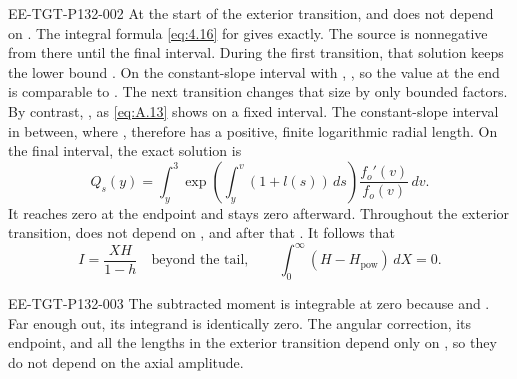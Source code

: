 \begin{EESegment}{EE-TGT-P132-002}
At the start of the exterior transition,
 and
 does not depend on
. The integral formula \eqref{eq:4.16} for
 gives
 exactly. The source
 is nonnegative from there until the final interval. During the
first transition, that solution keeps the lower bound
. On
the constant-slope interval with
, , so the value at the end is
comparable to . The next transition changes that size by
only bounded factors. By contrast, , as
\eqref{eq:A.13} shows on a fixed interval. The constant-slope interval in between, where
, therefore has a positive, finite logarithmic radial length.
On the final interval, the exact solution is
\begin{equation}
Q_s(y)=\int_y^3\exp\left(\int_y^v(1+l(s))\,ds\right)\frac{f_o'(v)}{f_o(v)}\,dv.
\tag{A.16}\label{eq:A.16}
\end{equation}
It reaches zero at the endpoint and stays zero afterward. Throughout the exterior
transition,  does not depend on
, and after that
. It follows that
\[
I=\frac{XH}{1-h}\quad\text{beyond the tail},
\qquad
\int_0^\infty(H-H_{\mathrm{pow}})\,dX=0.
\]
\end{EESegment}

\begin{EESegment}{EE-TGT-P132-003}
The subtracted moment is integrable at zero because
 and
. Far enough out, its integrand is identically zero. The
angular correction, its endpoint, and all the lengths in the exterior transition depend only
on , so they do not depend on the axial amplitude.
\end{EESegment}


